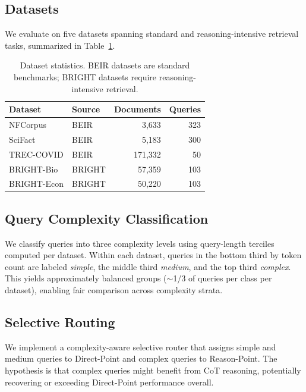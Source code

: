 \documentclass[sigconf,review]{acmart}
\begin{document}
\subsection{Datasets}

We evaluate on five datasets spanning standard and reasoning-intensive retrieval tasks, summarized in Table~\ref{tab:datasets}.

\begin{table}[t]
\caption{Dataset statistics. BEIR datasets are standard benchmarks; BRIGHT datasets require reasoning-intensive retrieval.}
\label{tab:datasets}
\centering
\small
\begin{tabular}{llrr}
\toprule
\textbf{Dataset} & \textbf{Source} & \textbf{Documents} & \textbf{Queries} \\
\midrule
NFCorpus    & BEIR   & 3{,}633   & 323 \\
SciFact     & BEIR   & 5{,}183   & 300 \\
TREC-COVID  & BEIR   & 171{,}332 & 50  \\
BRIGHT-Bio  & BRIGHT & 57{,}359  & 103 \\
BRIGHT-Econ & BRIGHT & 50{,}220  & 103 \\
\bottomrule
\end{tabular}
\end{table}

\subsection{Query Complexity Classification}
\label{sec:complexity}

We classify queries into three complexity levels using query-length terciles computed per dataset. Within each dataset, queries in the bottom third by token count are labeled \emph{simple}, the middle third \emph{medium}, and the top third \emph{complex}. This yields approximately balanced groups ($\sim$1/3 of queries per class per dataset), enabling fair comparison across complexity strata.

\subsection{Selective Routing}

We implement a complexity-aware selective router that assigns simple and medium queries to Direct-Point and complex queries to Reason-Point. The hypothesis is that complex queries might benefit from CoT reasoning, potentially recovering or exceeding Direct-Point performance overall.
\end{document}
